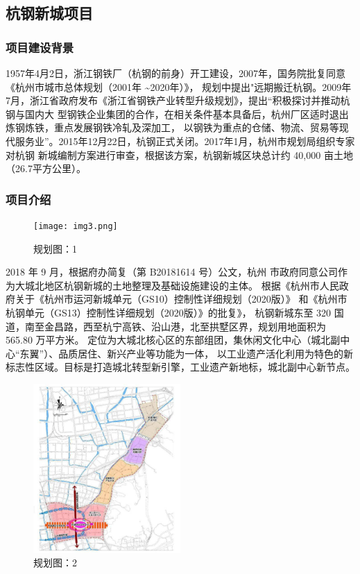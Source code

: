 \documentclass[H:\workspace\担保人财务信息2\杭州大运河\HangZhouText.tex]{subfiles}
\begin{document}
\newpage   

\subsection{杭钢新城项目}
\subsubsection{项目建设背景}
1957年4月2日，浙江钢铁厂（杭钢的前身）开工建设，2007年，国务院批复同意《杭州市城市总体规划（2001年 \textasciitilde 2020年）》，
规划中提出"远期搬迁杭钢。2009年7月，浙江省政府发布《浙江省钢铁产业转型升级规划》，提出“积极探讨并推动杭钢与国内大
型钢铁企业集团的合作，在相关条件基本具备后，杭州厂区适时退出炼钢炼铁，重点发展钢铁冷轧及深加工，
以钢铁为重点的仓储、物流、贸易等现代服务业”。2015年12月22日，杭钢正式关闭。2017年1月，杭州市规划局组织专家对杭钢
新城编制方案进行审查，根据该方案，杭钢新城区块总计约 40,000 亩土地（26.7平方公里）。
\subsubsection{项目介绍}
\begin{figure} %
    \centering 
    \texttt{[image: img3.png]}
    \caption{规划图：1}
    \label{fig:a}
\end{figure}

2018 年 9 月，根据府办简复（第 B20181614 号）公文，杭州
市政府同意公司作为大城北地区杭钢新城的土地整理及基础设施建设的主体。
根据《杭州市人民政府关于《杭州市运河新城单元（GS10）控制性详细规划（2020版）》
和《杭州市杭钢单元（GS13）控制性详细规划（2020版）》的批复》，
杭钢新城东至 320 国道，南至金昌路，西至杭宁高铁、沿山港，北至拱墅区界，规划用地面积为 565.80 万平方米。
定位为大城北核心区的东部组团，集休闲文化中心（城北副中心“东翼”）、品质居住、新兴产业等功能为一体，
以工业遗产活化利用为特色的新标志性区域。目标是打造城北转型新引擎，工业遗产新地标，城北副中心新节点。\par 

\begin{figure}
    \centering 
    \includegraphics[width=0.5\textwidth]{img4.png}
    \caption{规划图：2}
    \vspace{-1cm}
    \label{fig:b}
\end{figure}
\end{document}
